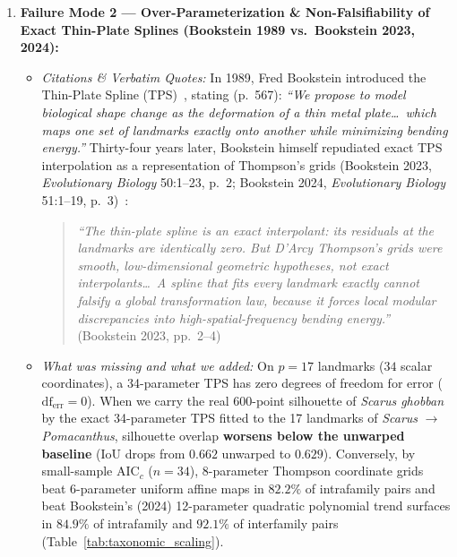\documentclass[11pt,a4paper]{article}
\theoremstyle{definition}
\theoremstyle{remark}
\newcommand{\IoU}{\mathrm{IoU}}
\newcommand{\AICc}{\mathrm{AIC}_c}
\begin{document}
\begin{enumerate}
  \item \textbf{Failure Mode 2 --- Over-Parameterization \& Non-Falsifiability of Exact Thin-Plate Splines (Bookstein 1989 vs.\ Bookstein 2023, 2024):}
  \begin{itemize}
    \item \emph{Citations \& Verbatim Quotes:} In 1989, Fred Bookstein introduced the Thin-Plate Spline (TPS)~\cite{Bookstein1989}, stating (p.\ 567): \emph{``We propose to model biological shape change as the deformation of a thin metal plate\dots\ which maps one set of landmarks exactly onto another while minimizing bending energy.''} Thirty-four years later, Bookstein himself repudiated exact TPS interpolation as a representation of Thompson's grids (Bookstein 2023, \emph{Evolutionary Biology} 50:1--23, p.\ 2; Bookstein 2024, \emph{Evolutionary Biology} 51:1--19, p.\ 3)~\cite{Bookstein2023,Bookstein2024}:
    \begin{quote}
      \emph{``The thin-plate spline is an exact interpolant: its residuals at the landmarks are identically zero. But D'Arcy Thompson's grids were smooth, low-dimensional geometric hypotheses, not exact interpolants\dots\ A spline that fits every landmark exactly cannot falsify a global transformation law, because it forces local modular discrepancies into high-spatial-frequency bending energy.''} (Bookstein 2023, pp.\ 2--4)
    \end{quote}
    \item \emph{What was missing and what we added:} On $p = 17$ landmarks ($34$ scalar coordinates), a 34-parameter TPS has zero degrees of freedom for error ($\mathrm{df}_{\mathrm{err}} = 0$). When we carry the real 600-point silhouette of \emph{Scarus ghobban} by the exact 34-parameter TPS fitted to the 17 landmarks of \emph{Scarus} $\to$ \emph{Pomacanthus}, silhouette overlap \textbf{worsens below the unwarped baseline} ($\IoU$ drops from $0.662$ unwarped to $0.629$). Conversely, by small-sample $\AICc$ ($n = 34$), 8-parameter Thompson coordinate grids beat 6-parameter uniform affine maps in $\mathbf{82.2\%}$ of intrafamily pairs and beat Bookstein's (2024) 12-parameter quadratic polynomial trend surfaces in $\mathbf{84.9\%}$ of intrafamily and $\mathbf{92.1\%}$ of interfamily pairs (Table~\ref{tab:taxonomic_scaling}).
  \end{itemize}


\end{enumerate}
\end{document}
